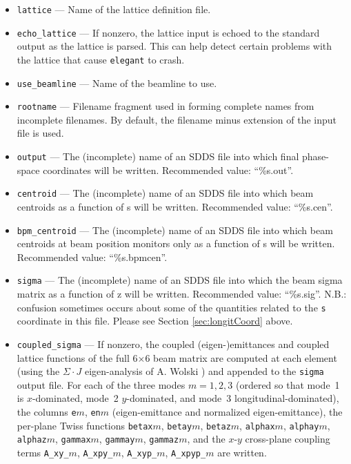 \documentclass[11pt]{article}
\begin{document}
\begin{itemize}
\item \verb|lattice| --- Name of the lattice definition file.
\item \verb|echo_lattice| --- If nonzero, the lattice input is echoed to the
        standard output as the lattice is parsed.  This can help detect certain
        problems with the lattice that cause \verb|elegant| to crash.
\item \verb|use_beamline| --- Name of the beamline to use.
\item \verb|rootname| --- Filename fragment used in forming complete names from incomplete filenames.  By default, 
the filename minus extension of the input file is used.
\item \verb|output| --- The (incomplete) name of an SDDS file into which final phase-space coordinates
will be written.  Recommended value: ``\%s.out''.
\item \verb|centroid| --- The (incomplete) name of an SDDS file into which beam centroids as a function
of s will be written.   Recommended value: ``\%s.cen''.
\item \verb|bpm_centroid| --- The (incomplete) name of an SDDS file into which beam centroids at beam position monitors
only as a function of s will be written.   Recommended value: ``\%s.bpmcen''.
\item \verb|sigma| --- The (incomplete) name of an SDDS file into
which the beam sigma matrix as a function of z will be written.
Recommended value: ``\%s.sig''.  N.B.: confusion sometimes occurs about some of the quantities related to
the {\tt s} coordinate in this file.  Please see Section \ref{sec:longitCoord} above.
\item \verb|coupled_sigma| --- If nonzero, the coupled (eigen-)emittances and coupled
lattice functions of the full 6$\times$6 beam matrix are computed at each element (using the
$\Sigma\cdot J$ eigen-analysis of A. Wolski \cite{Wolski-PRSTAB9-024001}) and appended to the
\verb|sigma| output file.  For each of the three modes $m=1,2,3$ (ordered so that mode~1 is
$x$-dominated, mode~2 $y$-dominated, and mode~3 longitudinal-dominated), the columns
\verb|e|$m$, \verb|en|$m$ (eigen-emittance and normalized eigen-emittance), the per-plane Twiss
functions \verb|betax|$m$, \verb|betay|$m$, \verb|betaz|$m$, \verb|alphax|$m$, \verb|alphay|$m$,
\verb|alphaz|$m$, \verb|gammax|$m$, \verb|gammay|$m$, \verb|gammaz|$m$, and the $x$-$y$ cross-plane
coupling terms \verb|A_xy_|$m$, \verb|A_xpy_|$m$, \verb|A_xyp_|$m$, \verb|A_xpyp_|$m$ are written.

\end{itemize}
\end{document}
